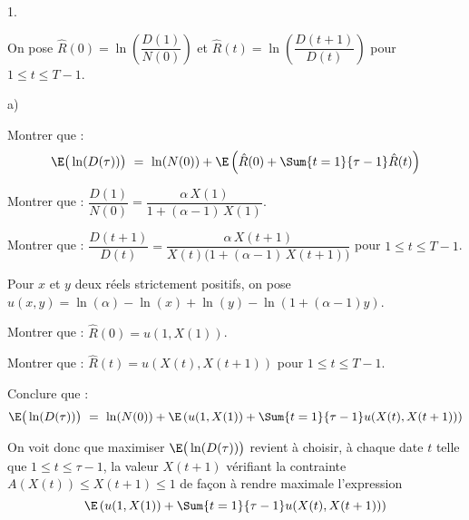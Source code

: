 \begin{noliste}{1.}
  
  
  
  
  \noindent
  On pose $\hat{R}(0) = \ln \left( \dfrac{D(1)}{N(0)}\right)$ et 
  $\hat{R}(t) = \ln \left( \dfrac{D(t+1)}{D(t)}\right)$ pour $1 \leq t 
  \leq T-1$.
  
  \item 
  \begin{noliste}{a)}
    \setlength{\itemsep}{2mm}
    \item Montrer que :
    \[
      \E\big(\ln(D(\tau))\big) \ = \ \ln(N(0)) + \E\left( \hat{R}(0)
      + \Sum{t=1}{\tau -1} \hat{R}(t)\right)
    \]
    
    
    
    \item Montrer que : $\dfrac{D(1)}{N(0)} = \dfrac{\alpha \, X(1)}
    {1+(\alpha-1) \, X(1)}$.
    
    
        
    \item Montrer que : $\dfrac{D(t+1)}{D(t)} = \dfrac{\alpha \, X(t+1)}
    {X(t) \big(1+ (\alpha -1) \, X(t+1)\big)}$ pour $1 \leq t \leq 
    T-1$.
    
    

    
    
    
    Pour $x$ et $y$ deux réels strictement positifs, on pose $u(x,y)=
    \ln(\alpha) - \ln(x) + \ln(y) - \ln(1+(\alpha-1)y)$.
    
    \item Montrer que : $\hat{R}(0) = u(1,X(1))$.
    
    

    
    \item Montrer que : $\hat{R}(t) = u(X(t),X(t+1))$ pour 
    $1 \leq t \leq T-1$.
    
    
        
    \item Conclure que :
    \[
      \E\big(\ln(D(\tau))\big) \ = \ \ln(N(0)) + \E\left( u(1,X(1)) + 
      \Sum{t=1}{\tau -1} u(X(t),X(t+1))\right)
    \]
    
    
  \end{noliste}
\end{noliste}

\noindent
On voit donc que maximiser $\E\big(\ln(D(\tau))\big)$ revient à choisir,
à chaque date $t$ telle que $1 \leq t \leq \tau -1$, la valeur $X(t+1)$ 
vérifiant la contrainte $A(X(t)) \leq X(t+1) \leq 1$ de façon à rendre 
maximale l'expression
\[
  \E\left(u(1,X(1)) + \Sum{t=1}{\tau-1} u(X(t), X(t+1))\right)
\]




